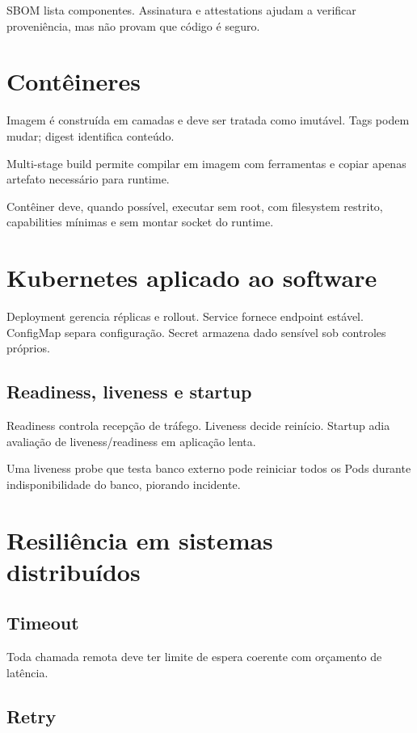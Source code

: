 SBOM lista componentes. Assinatura e attestations ajudam a verificar proveniência, mas não provam que código é seguro.

\section{Contêineres}

Imagem é construída em camadas e deve ser tratada como imutável. Tags podem mudar; digest identifica conteúdo.

Multi-stage build permite compilar em imagem com ferramentas e copiar apenas artefato necessário para runtime.

Contêiner deve, quando possível, executar sem root, com filesystem restrito, capabilities mínimas e sem montar socket do runtime.

\section{Kubernetes aplicado ao software}

Deployment gerencia réplicas e rollout. Service fornece endpoint estável. ConfigMap separa configuração. Secret armazena dado sensível sob controles próprios.

\subsection{Readiness, liveness e startup}

Readiness controla recepção de tráfego. Liveness decide reinício. Startup adia avaliação de liveness/readiness em aplicação lenta.

Uma liveness probe que testa banco externo pode reiniciar todos os Pods durante indisponibilidade do banco, piorando incidente.

\section{Resiliência em sistemas distribuídos}

\subsection{Timeout}

Toda chamada remota deve ter limite de espera coerente com orçamento de latência.

\subsection{Retry}

